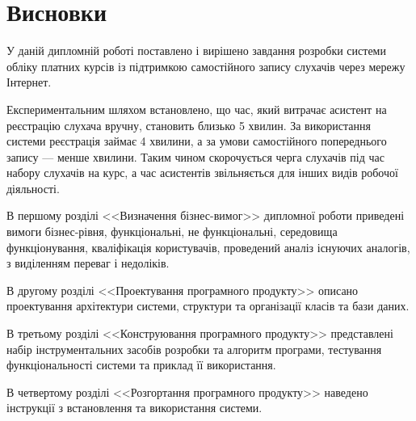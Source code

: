 \newpage
\section*{Висновки}
\bigskip
У даній дипломній роботі поставлено і вирішено завдання розробки системи обліку платних курсів із підтримкою самостійного запису слухачів через мережу Інтернет.

Експериментальним шляхом встановлено, що час, який витрачає асистент на реєстрацію слухача вручну, становить близько 5 хвилин. За використання системи реєстрація займає 4 хвилини, а за умови самостійного попереднього запису --- менше хвилини. Таким чином скорочується черга слухачів під час набору слухачів на курс, а час асистентів звільняється для інших видів робочої діяльності.

В першому розділі <<Визначення бізнес-вимог>> дипломної роботи приведені вимоги бізнес-рівня, функціональні, не функціональні, середовища функціонування, кваліфікація користувачів, проведений аналіз існуючих аналогів, з виділенням  переваг і недоліків.

В другому розділі <<Проектування програмного продукту>> описано проектування архітектури системи, структури та організації класів та бази даних.

В третьому розділі <<Конструювання програмного продукту>> представлені набір інструментальних засобів розробки та алгоритм програми, тестування функціональності системи та приклад її використання.

В четвертому розділі <<Розгортання програмного продукту>> наведено інструкції з встановлення та використання системи.
